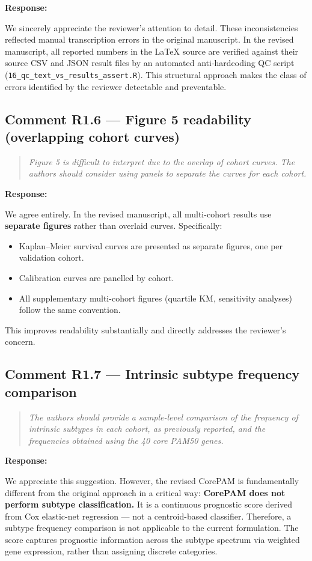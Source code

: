 \documentclass[11pt]{article}
\newcommand{\reviewerquote}[1]{\begin{quote}\itshape #1\end{quote}}
\begin{document}
\noindent\textbf{Response:}

We sincerely appreciate the reviewer's attention to detail. These inconsistencies reflected manual transcription errors in the original manuscript. In the revised manuscript, all reported numbers in the LaTeX source are verified against their source CSV and JSON result files by an automated anti-hardcoding QC script (\texttt{16\_qc\_text\_vs\_results\_assert.R}). This structural approach makes the class of errors identified by the reviewer detectable and preventable.

\subsection*{Comment R1.6 --- Figure 5 readability (overlapping cohort curves)}

\reviewerquote{Figure 5 is difficult to interpret due to the overlap of cohort curves. The authors should consider using panels to separate the curves for each cohort.}

\noindent\textbf{Response:}

We agree entirely. In the revised manuscript, all multi-cohort results use \textbf{separate figures} rather than overlaid curves. Specifically:

\begin{itemize}
  \item Kaplan--Meier survival curves are presented as separate figures, one per validation cohort.
  \item Calibration curves are panelled by cohort.
  \item All supplementary multi-cohort figures (quartile KM, sensitivity analyses) follow the same convention.
\end{itemize}

This improves readability substantially and directly addresses the reviewer's concern.

\subsection*{Comment R1.7 --- Intrinsic subtype frequency comparison}

\reviewerquote{The authors should provide a sample-level comparison of the frequency of intrinsic subtypes in each cohort, as previously reported, and the frequencies obtained using the 40 core PAM50 genes.}

\noindent\textbf{Response:}

We appreciate this suggestion. However, the revised CorePAM is fundamentally different from the original approach in a critical way: \textbf{CorePAM does not perform subtype classification.} It is a continuous prognostic score derived from Cox elastic-net regression --- not a centroid-based classifier. Therefore, a subtype frequency comparison is not applicable to the current formulation. The score captures prognostic information across the subtype spectrum via weighted gene expression, rather than assigning discrete categories.
\end{document}
